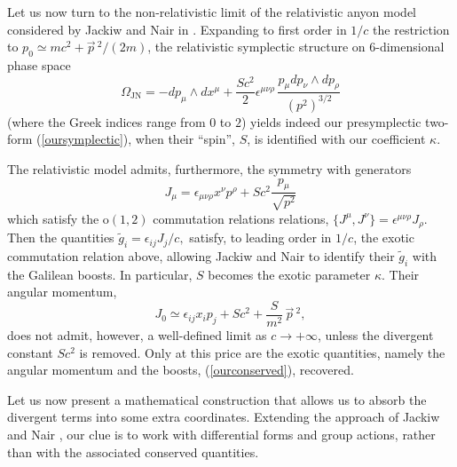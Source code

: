 \documentclass[a4paper,11pt]{article}
\def\vp{{\vec p}}
\begin{document}
Let us now turn to the non-relativistic limit
of the relativistic anyon model \cite{JaNa} considered by
Jackiw and Nair in \cite{JaNa2}.
Expanding  to first order in $1/c$ the restriction to
$p_0\simeq mc^2+\vp{\,}^2/(2m)$,
the relativistic symplectic structure on $6$-di\-men\-sio\-nal phase space
\begin{equation}
\Omega_{\mathrm{JN}}=-dp_\mu\wedge dx^\mu+\frac{Sc^2}{2}
\epsilon^{\mu\nu\rho}\,\frac{p_\mu{}dp_\nu\wedge{}dp_\rho}
{(p^2)^{3/2}}
\label{JNsymp}
\end{equation}
(where the Greek indices range from
$0$ to $2$) yields indeed our
presymplectic two-form (\ref{oursymplectic}), when their ``spin'', $S$, is
identified with our coefficient $\kappa$.
\goodbreak

The relativistic model admits, furthermore, the symmetry with generators
\begin{equation}
J_\mu=
\epsilon_{\mu\nu\rho}x^{\nu}p^\rho
+Sc^2\frac{p_{\mu}}{\sqrt{p^2}}
\end{equation}
which satisfy the o$(1,2)$ commutation relations relations,
$\{J^\mu,J^\nu\}=\epsilon^{\mu\nu\rho}J_\rho$.
Then the quantities
$
\widetilde{g}_i=\epsilon_{ij}J_j/c,
$
satisfy, to leading order in $1/c$,
the exotic commutation relation above,
allowing Jackiw and Nair to identify their $\widetilde{g}_i$
with the Galilean boosts.
In particular, $S$ becomes the exotic parameter
$\kappa$.
Their angular momentum,
\begin{equation}
J_0\simeq\epsilon_{ij}x_ip_j+Sc^2+\frac{S}{m^2}\,\vp{\,}^2,
\label{JNangmom}
\end{equation}
does not admit, however, a well-defined limit  as $c\to+\infty$, unless the
divergent constant  $Sc^2$ is removed. Only at this price are the exotic
quantities, namely the angular momentum and the boosts, (\ref{ourconserved}),
recovered.


Let us now present a mathematical construction that allows us to absorb the
divergent terms into some extra coordinates. Extending the approach of
Jackiw and
Nair \cite{JaNa2}, our clue is to work with differential forms and group
actions,
rather than with the associated conserved quantities.
\end{document}
